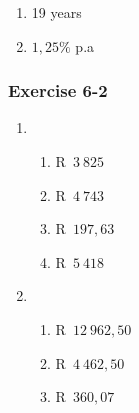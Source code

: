 {\begin{multicols}{3}
\begin{enumerate}[noitemsep, label=\textbf{\arabic*}.]
\begin{enumerate}[noitemsep, label=\textbf{(\alph*)} ]
	    \item R~$3~937,50$ %
	\end{enumerate}

	\item 19 years %

	\item $1,25\%$ p.a%
    \end{enumerate}


\subsubsection*{Exercise 6-2} %

    \begin{enumerate}[label=\textbf{\arabic*}.]
	\item %
	\begin{enumerate}[noitemsep, label=\textbf{(\alph*)} ]
	    \item R~$3~825$%
	    \item R~$4~743$%
	    \item R~$197,63$%
	    \item R~$5~418$%
	\end{enumerate}


	\item %
	\begin{enumerate}[noitemsep, label=\textbf{(\alph*)} ]
	    \item R~$12~962,50$%
	    \item R~$4~462,50$ %
	    \item R~$360,07$%
	\end{enumerate}


\end{enumerate}
\end{multicols}}

